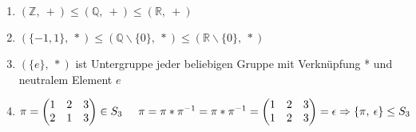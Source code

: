 \documentclass[a4paper,11pt]{article}
\begin{document}
\begin{enumerate}[label=\alph*)]
\item $(\mathbb{Z},\:+)\leq(\mathbb{Q},\:+)\leq(\mathbb{R},\:+)$
\item $(\{-1,1\},\:*)\leq(\mathbb{Q}\backslash\{0\},\:*)\leq(\mathbb{R}\backslash\{0\},\:*)$
\item $(\{e\},\:*)$ ist Untergruppe jeder beliebigen Gruppe mit Verknüpfung * und neutralem Element $e$
\item $\pi=\begin{pmatrix}1&2&3\\2&1&3\end{pmatrix}\in S_3\hspace{5mm}\pi=\pi*\pi^{-1} \\
=\pi*\pi^{-1}=\begin{pmatrix}1&2&3\\1&2&3\end{pmatrix}=\epsilon \\
\Rightarrow\{\pi,\:\epsilon\}\leq S_3$
\end{enumerate}
\newpage
\end{document}
